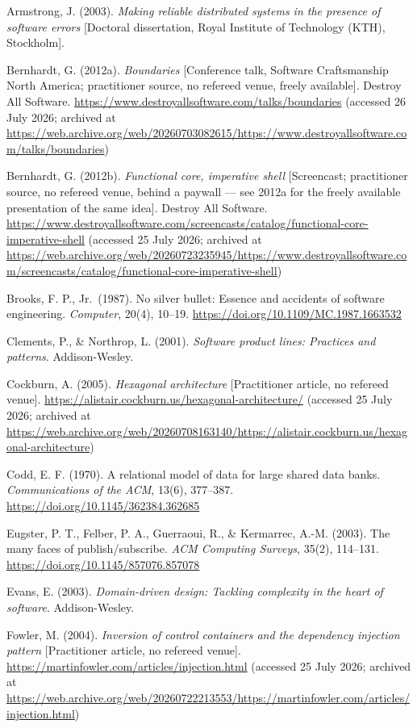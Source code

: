 \documentclass[
]{article}
\begin{document}
Armstrong, J. (2003). \emph{Making reliable distributed systems in the
presence of software errors} {[}Doctoral dissertation, Royal Institute
of Technology (KTH), Stockholm{]}.

Bernhardt, G. (2012a). \emph{Boundaries} {[}Conference talk, Software
Craftsmanship North America; practitioner source, no refereed venue,
freely available{]}. Destroy All Software.
\url{https://www.destroyallsoftware.com/talks/boundaries} (accessed 26
July 2026; archived at
\url{https://web.archive.org/web/20260703082615/https://www.destroyallsoftware.com/talks/boundaries})

Bernhardt, G. (2012b). \emph{Functional core, imperative shell}
{[}Screencast; practitioner source, no refereed venue, behind a paywall
--- see 2012a for the freely available presentation of the same idea{]}.
Destroy All Software.
\url{https://www.destroyallsoftware.com/screencasts/catalog/functional-core-imperative-shell}
(accessed 25 July 2026; archived at
\url{https://web.archive.org/web/20260723235945/https://www.destroyallsoftware.com/screencasts/catalog/functional-core-imperative-shell})

Brooks, F. P., Jr.~(1987). No silver bullet: Essence and accidents of
software engineering. \emph{Computer}, 20(4), 10--19.
\url{https://doi.org/10.1109/MC.1987.1663532}

Clements, P., \& Northrop, L. (2001). \emph{Software product lines:
Practices and patterns}. Addison-Wesley.

Cockburn, A. (2005). \emph{Hexagonal architecture} {[}Practitioner
article, no refereed venue{]}.
\url{https://alistair.cockburn.us/hexagonal-architecture/} (accessed 25
July 2026; archived at
\url{https://web.archive.org/web/20260708163140/https://alistair.cockburn.us/hexagonal-architecture})

Codd, E. F. (1970). A relational model of data for large shared data
banks. \emph{Communications of the ACM}, 13(6), 377--387.
\url{https://doi.org/10.1145/362384.362685}

Eugster, P. T., Felber, P. A., Guerraoui, R., \& Kermarrec, A.-M.
(2003). The many faces of publish/subscribe. \emph{ACM Computing
Surveys}, 35(2), 114--131. \url{https://doi.org/10.1145/857076.857078}

Evans, E. (2003). \emph{Domain-driven design: Tackling complexity in the
heart of software}. Addison-Wesley.

Fowler, M. (2004). \emph{Inversion of control containers and the
dependency injection pattern} {[}Practitioner article, no refereed
venue{]}. \url{https://martinfowler.com/articles/injection.html}
(accessed 25 July 2026; archived at
\url{https://web.archive.org/web/20260722213553/https://martinfowler.com/articles/injection.html})
\end{document}
